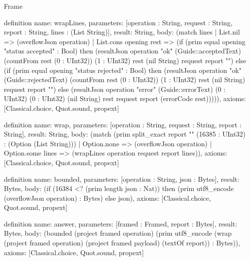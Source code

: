 \begin{lexlean}{Frame}
\begin{semanticmodule}
definition{
  name: wrapLines,
  parameters: [operation : String, request : String, report : String, lines : (List String)],
  result: String,
  body: (match lines
    | List.nil => (overflowJson operation)
    | List.cons opening rest => (if (prim equal opening "status accepted" : Bool) then (resultJson operation "ok" (Guide::acceptedText) (countFrom rest (0 : UInt32)) (1 : UInt32) rest (nil String) request report "") else (if (prim equal opening "status rejected" : Bool) then (resultJson operation "ok" (Guide::rejectedText) (countFrom rest (0 : UInt32)) (1 : UInt32) rest (nil String) request report "") else (resultJson operation "error" (Guide::errorText) (0 : UInt32) (0 : UInt32) (nil String) rest request report (errorCode rest))))),
  axioms: [Classical.choice, Quot.sound, propext]
}

definition{
  name: wrap,
  parameters: [operation : String, request : String, report : String],
  result: String,
  body: (match (prim split_exact report "\n" (16385 : UInt32) : (Option (List String)))
    | Option.none => (overflowJson operation)
    | Option.some lines => (wrapLines operation request report lines)),
  axioms: [Classical.choice, Quot.sound, propext]
}

definition{
  name: bounded,
  parameters: [operation : String, json : Bytes],
  result: Bytes,
  body: (if (16384 <? (prim length json : Nat)) then (prim utf8_encode (overflowJson operation) : Bytes) else json),
  axioms: [Classical.choice, Quot.sound, propext]
}

definition{
  name: answer,
  parameters: [framed : Framed, report : Bytes],
  result: Bytes,
  body: (bounded (project framed operation) (prim utf8_encode (wrap (project framed operation) (project framed payload) (textOf report)) : Bytes)),
  axioms: [Classical.choice, Quot.sound, propext]
}
\end{semanticmodule}
\end{lexlean}

